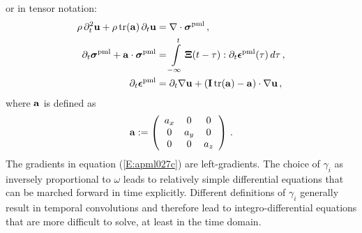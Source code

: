 or in tensor notation:
\begin{subequations}\label{E:apml027}
\begin{align}
\rho\,\partial_t^2\mathbf{u}+\rho\,\text{tr}(\mathbf{a})\,\partial_t \mathbf{u} &=
\nabla\cdot\boldsymbol{\sigma}^{\text{pml}}\,,\label{E:apml027a}\\
\partial_t\boldsymbol{\sigma}^{\text{pml}} +
\mathbf{a}\cdot\boldsymbol{\sigma}^{\text{pml}} &=\int\limits_{-\infty}^{t}
\boldsymbol{\Xi}(t-\tau):\partial_t\boldsymbol{\epsilon}^{\text{pml}}(\tau)\,d\tau\,,\label{E:apml027b}\\
\partial_t\boldsymbol{\epsilon}^{\text{pml}} &= \partial_t \nabla\mathbf{u} +
(\mathbf{I}\,\text{tr}(\mathbf{a})-\mathbf{a})\cdot\nabla
\mathbf{u}\,,\label{E:apml027c}
\end{align}
\end{subequations}
where $\mathbf{a}$ is defined as
\begin{equation}\label{E:apml028}
\mathbf{a}:=\left(
         \begin{array}{ccc}
           a_x & 0 & 0 \\
           0 & a_y & 0 \\
           0 & 0 & a_z \\
         \end{array}
       \right)\,.
\end{equation}
The gradients in equation (\ref{E:apml027c}) are left-gradients. The
choice of $\gamma_i$ as inversely proportional to $\omega$ leads to
relatively simple differential equations that can be marched forward
in time explicitly. Different definitions of $\gamma_i$ generally
result in temporal convolutions and therefore lead to
integro-differential equations that are more difficult to solve, at
least in the time domain.
